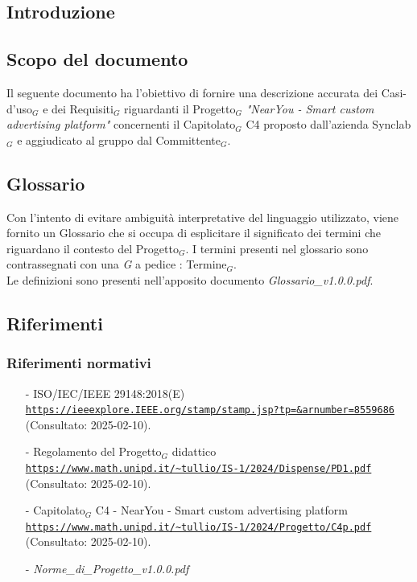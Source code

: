 \documentclass[10pt]{article}
\begin{document}
\newpage
\tableofcontents
\newpage
\listoffigures
\newpage
\listoftables

\newpage
\begin{justify}

\section{Introduzione}
\label{sec:intro}

\subsection{Scopo del documento}

Il seguente documento ha l'obiettivo di fornire una descrizione accurata dei Casi-d'uso$_G$ e dei Requisiti$_G$ riguardanti il Progetto$_G$ \textit{"NearYou - 
Smart custom advertising platform"} concernenti il Capitolato$_G$ C4 proposto dall'azienda Synclab$_G$ e aggiudicato al gruppo dal Committente$_G$.


\subsection{Glossario}
Con l'intento di evitare ambiguità interpretative del linguaggio utilizzato, viene fornito un Glossario che si occupa di esplicitare il significato dei termini che riguardano il contesto del Progetto$_G$. I termini presenti nel glossario sono contrassegnati con una \textit{G} a pedice : Termine$_G$.\\
Le definizioni sono presenti nell'apposito documento \textit{Glossario\_v1.0.0.pdf}.


\subsection{Riferimenti}

\subsubsection{Riferimenti normativi}
\begin{itemize}
    \item[-] ISO/IEC/IEEE 29148:2018(E) \\
    \textcolor{blue}{\texttt{\url{https://ieeexplore.IEEE.org/stamp/stamp.jsp?tp=&arnumber=8559686}}}\\ (Consultato: 2025-02-10).   
    \item[-] Regolamento del Progetto$_G$ didattico  \\
    \textcolor{blue}{\texttt{\url{https://www.math.unipd.it/~tullio/IS-1/2024/Dispense/PD1.pdf}}}\\ (Consultato: 2025-02-10).
    \item[-] Capitolato$_G$ C4 - NearYou - Smart custom advertising platform\\
    \textcolor{blue}{\texttt{\url{https://www.math.unipd.it/~tullio/IS-1/2024/Progetto/C4p.pdf}}}\\ (Consultato: 2025-02-10).
    \item[-] \textit{Norme\_di\_Progetto\_v1.0.0.pdf}
    

\end{itemize}
\end{justify}
\end{document}
